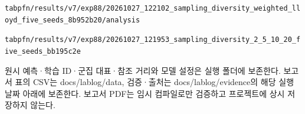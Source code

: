 \texttt{tabpfn/\allowbreak{}\allowbreak{}r\allowbreak{}esults/\allowbreak{}\allowbreak{}v\allowbreak{}7/\allowbreak{}\allowbreak{}exp88/\allowbreak{}\allowbreak{}20261027\allowbreak{}\_\allowbreak{}\allowbreak{}122102\_\allowbreak{}\allowbreak{}sampling\allowbreak{}\_\allowbreak{}\allowbreak{}diversi\allowbreak{}ty\_\allowbreak{}\allowbreak{}weigh\allowbreak{}ted\_\allowbreak{}\allowbreak{}lloy\allowbreak{}d\_\allowbreak{}\allowbreak{}five\_\allowbreak{}\allowbreak{}s\allowbreak{}eeds\_\allowbreak{}\allowbreak{}8b9\allowbreak{}52b20/\allowbreak{}\allowbreak{}an\allowbreak{}alysis}

\texttt{tabpfn/\allowbreak{}\allowbreak{}r\allowbreak{}esults/\allowbreak{}\allowbreak{}v\allowbreak{}7/\allowbreak{}\allowbreak{}exp88/\allowbreak{}\allowbreak{}20261027\allowbreak{}\_\allowbreak{}\allowbreak{}121953\_\allowbreak{}\allowbreak{}sampling\allowbreak{}\_\allowbreak{}\allowbreak{}diversi\allowbreak{}ty\_\allowbreak{}\allowbreak{}2\_\allowbreak{}\allowbreak{}5\_\allowbreak{}\allowbreak{}1\allowbreak{}0\_\allowbreak{}\allowbreak{}20\_\allowbreak{}\allowbreak{}fiv\allowbreak{}e\_\allowbreak{}\allowbreak{}seeds\_\allowbreak{}\allowbreak{}bb195c2e\allowbreak{}}

원시 예측·학습 ID·군집 대표·참조 거리와 모델 설정은 실행 폴더에 보존한다. 보고서 표의 CSV는 docs/\allowbreak{}lablog/\allowbreak{}data, 검증·출처는 docs/\allowbreak{}lablog/\allowbreak{}evidence의 해당 실행 날짜 아래에 보존한다. 보고서 PDF는 임시 컴파일로만 검증하고 프로젝트에 상시 저장하지 않는다.



